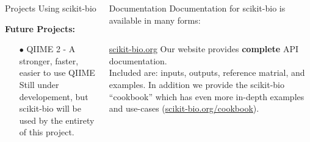 \documentclass[final,t]{beamer}
\begin{document}
\begin{frame}{}
\begin{columns}[t]
\begin{column}{.3\linewidth}
\begin{block}{Projects Using scikit-bio}
\begin{itemize}
            \end{itemize}

            \textbf{Future Projects:} \\
            \begin{itemize}
              \item[$\bullet$] QIIME 2 - A stronger, faster, easier to use QIIME \hfill \\
              Still under developement, but scikit-bio will be used by the entirety of this project.
              \newline
          \end{itemize}
        \end{block}



    \end{column}
    \begin{column}{.3\linewidth}


        \begin{block}{Documentation}
            Documentation for scikit-bio is available in many forms:
            \begin{columns}
                \begin{column}{.45\linewidth}
                    \begin{minipage}[c][15cm][c]{\linewidth}
                        \href{http://scikit-bio.org}{\color{blue}\underline{scikit-bio.org}}
                        \newline\newline
                        Our website provides \textbf{complete} API documentation. \\Included are: inputs, outputs, reference matrial, and examples. In addition we provide the scikit-bio ``cookbook'' which has even more in-depth examples and use-cases (\href{http://scikit-bio.org/cookbook}{\color{blue}\underline{scikit-bio.org/cookbook}}).


\end{minipage}
\end{column}
\end{columns}
\end{block}
\end{column}
\end{columns}
\end{frame}
\end{document}
